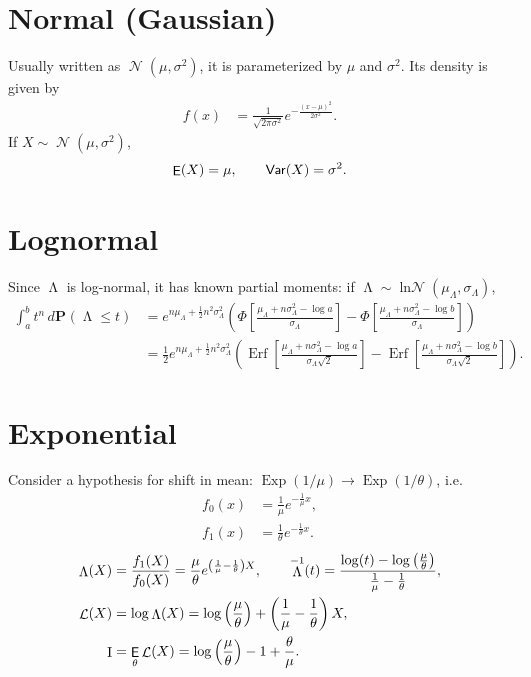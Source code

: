\documentclass{article}
\renewcommand{\Pr}{\mathbf{P}} %
\newcommand{\prob}[2][]{\Pr_{#1} \left( #2 \right)} %
\DeclareMathOperator{\erf}{\mathrm{Erf}} %
\DeclareMathOperator{\EV}{{\sf E}}    %
\DeclareMathOperator{\Var}{{\sf Var}} %
\DeclareMathOperator{\KLI}{I}
\DeclareMathOperator{\LLR}{\mathcal{L}} %
\DeclareMathOperator{\LR}{\Lambda} %
\DeclareMathOperator{\DNorm}{\mathcal{N}} %
\DeclareMathOperator{\DLogNorm}{\ln \DNorm } %
\DeclareMathOperator{\DExp}{\mathrm{Exp}} %
\begin{document}
\section{Normal (Gaussian)}

Usually written as $\DNorm \left(\mu , \sigma ^2\right)$, it is parameterized by $\mu $ and $\sigma ^2$. Its density is given by
\begin{align*}
    f(x) &= \frac{1}{\sqrt{2 \pi  \sigma ^2}} e^{-\frac{(x - \mu )^2}{2\sigma ^2}}.
\end{align*}
If $X \sim \DNorm \left(\mu , \sigma ^2\right)$,
\begin{align*}
    \EV (X) = \mu , \qquad
    \Var (X) = \sigma ^2.
\end{align*}

\section{Lognormal}

Since $\LR$ is log-normal, it has known partial moments: if $\LR \sim \DLogNorm \left(\mu _{\Lambda }, \sigma _{\Lambda }\right)$,
\begin{align*}
    \int_a^b t^n \,d\prob{\LR \le t} &= e^{n \mu _{\Lambda } + \frac{1}{2} n^2 \sigma _{\Lambda }^2} \left(\Phi \left[\frac{\mu _{\Lambda } + n \sigma _{\Lambda }^2 - \log a}{\sigma _{\Lambda }}\right] - \Phi \left[\frac{\mu _{\Lambda } + n \sigma _{\Lambda }^2 - \log b}{\sigma _{\Lambda}}\right]\right) \\
        &= \frac{1}{2} e^{n \mu _{\Lambda } + \frac{1}{2} n^2 \sigma _{\Lambda }^2} \left(\erf \left[\frac{\mu _{\Lambda } + n \sigma _{\Lambda }^2 - \log a}{\sigma _{\Lambda } \sqrt{2}}\right] - \erf \left[\frac{\mu _{\Lambda } + n \sigma _{\Lambda }^2 - \log b}{\sigma _{\Lambda } \sqrt{2}}\right]\right).
\end{align*}

\newpage

\section{Exponential}


Consider a hypothesis for shift in mean: $\DExp \left(1 / \mu \right) \longrightarrow \DExp \left(1 / \theta \right)$, i.e.
\begin{align*}
    f_0(x) &= \frac{1}{\mu } e^{-\frac{1}{\mu } x}, \\
    f_1(x) &= \frac{1}{\theta } e^{-\frac{1}{\theta } x}.
\end{align*}
\begin{align*}
    \LR (X) &= \frac{f_1(X)}{f_0(X)} = \frac{\mu }{\theta } e^{\left(\frac{1}{\mu } - \frac{1}{\theta }\right) X}, \qquad
        \LR ^{-1}(t) = \frac{\log (t) - \log \left(\frac{\mu }{\theta }\right)}{\frac{1}{\mu } - \frac{1}{\theta }}, \\
    \LLR (X) &= \log \LR (X) = \log \left(\frac{\mu }{\theta }\right) + \left(\frac{1}{\mu } - \frac{1}{\theta }\right) X, \\
    \KLI &= \EV_{\theta} \LLR (X) = \log \left(\frac{\mu }{\theta }\right) - 1 + \frac{\theta }{\mu }.
\end{align*}
\end{document}
